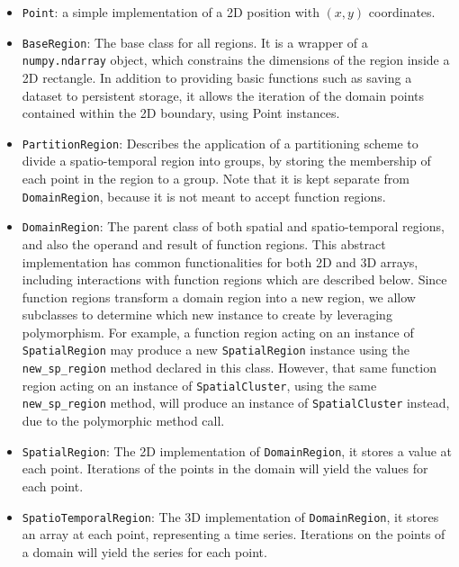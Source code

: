 \begin{itemize}
	\item \texttt{Point}: a simple implementation of a 2D position with $(x, y)$ coordinates.
	
	\item \texttt{BaseRegion}: The base class for all regions. It is a wrapper of a \texttt{numpy.ndarray} object, which constrains the dimensions of the region inside a 2D rectangle. In addition to providing basic functions such as saving a dataset to persistent storage, it allows the iteration of the domain points contained within the 2D boundary, using Point instances.
	
	\item \texttt{PartitionRegion}: Describes the application of a partitioning scheme to divide a spatio-temporal region into groups, by storing the membership of each point in the region to a group. Note that it is kept separate from \texttt{DomainRegion}, because it is not meant to accept function regions.
	
	\item \texttt{DomainRegion}: The parent class of both spatial and spatio-temporal regions, and also the operand and result of function regions. This abstract implementation has common functionalities for both 2D and 3D arrays, including interactions with function regions which are described below. Since function regions transform a domain region into a new region, we allow subclasses to determine which new instance to create by leveraging polymorphism. For example, a function region acting on an instance of \texttt{SpatialRegion} may produce a new \texttt{SpatialRegion} instance using the \texttt{new\_sp\_region} method declared in this class. However, that same function region acting on an instance of \texttt{SpatialCluster}, using the same \texttt{new\_sp\_region} method, will produce an instance of \texttt{SpatialCluster} instead, due to the polymorphic method call.
	
	\item \texttt{SpatialRegion}: The 2D implementation of \texttt{DomainRegion}, it stores a value at each point. Iterations of the points in the domain will yield the values for each point.
	
	\item \texttt{SpatioTemporalRegion}: The 3D implementation of \texttt{DomainRegion}, it stores an array at each point, representing a time series. Iterations on the points of a domain will yield the series for each point.
	

\end{itemize}
